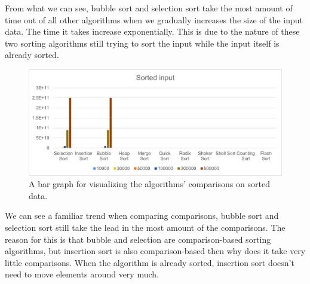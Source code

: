 \documentclass{article}
\newcommand\tab[1][0.5cm]{\hspace*{#1}}
\begin{document}
\tab From what we can see, bubble sort and selection sort take the most amount of time out of all other algorithms when we gradually increases the size of the input data. The time it takes increase exponentially. This is due to the nature of these two sorting algorithms still trying to sort the input while the input itself is already sorted.

\begin{figure}[H]
\includegraphics[scale = 0.8]{SortedBar.png}
\caption{A bar graph for visualizing the algorithms’ comparisons on sorted data.}
\centering
\end{figure}

We can see a familiar trend when comparing comparisons, bubble sort and selection sort still take the lead in the most amount of the comparisons. The reason for this is that bubble and selection are comparison-based sorting algorithms, but insertion sort is also comparison-based then why does it take very little comparisons. When the algorithm is already sorted, insertion sort doesn't need to move elements around very much.
\end{document}
